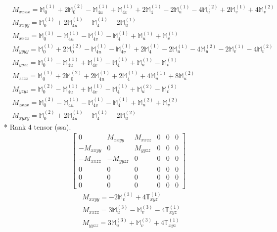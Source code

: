 \documentclass[fleqn,8pt,landscape]{jsarticle}
\begin{document}
\begin{align*}
& M_{xxxx} = \mathbb{M}_{0}^{(1)} + 2 \mathbb{M}_{0}^{(2)} - \mathbb{M}_{4u}^{(1)} + \mathbb{M}_{4v}^{(1)} + 2 \mathbb{M}_{4}^{(1)} - 2 \mathbb{M}_{u}^{(1)} - 4 \mathbb{M}_{u}^{(2)} + 2 \mathbb{M}_{v}^{(1)} + 4 \mathbb{M}_{v}^{(2)} \\
& M_{xxyy} = \mathbb{M}_{0}^{(1)} + 2 \mathbb{M}_{4u}^{(1)} - \mathbb{M}_{4}^{(1)} - 2 \mathbb{M}_{u}^{(1)} \\
& M_{xxzz} = \mathbb{M}_{0}^{(1)} - \mathbb{M}_{4u}^{(1)} - \mathbb{M}_{4v}^{(1)} - \mathbb{M}_{4}^{(1)} + \mathbb{M}_{u}^{(1)} + \mathbb{M}_{v}^{(1)} \\
& M_{yyyy} = \mathbb{M}_{0}^{(1)} + 2 \mathbb{M}_{0}^{(2)} - \mathbb{M}_{4u}^{(1)} - \mathbb{M}_{4v}^{(1)} + 2 \mathbb{M}_{4}^{(1)} - 2 \mathbb{M}_{u}^{(1)} - 4 \mathbb{M}_{u}^{(2)} - 2 \mathbb{M}_{v}^{(1)} - 4 \mathbb{M}_{v}^{(2)} \\
& M_{yyzz} = \mathbb{M}_{0}^{(1)} - \mathbb{M}_{4u}^{(1)} + \mathbb{M}_{4v}^{(1)} - \mathbb{M}_{4}^{(1)} + \mathbb{M}_{u}^{(1)} - \mathbb{M}_{v}^{(1)} \\
& M_{zzzz} = \mathbb{M}_{0}^{(1)} + 2 \mathbb{M}_{0}^{(2)} + 2 \mathbb{M}_{4u}^{(1)} + 2 \mathbb{M}_{4}^{(1)} + 4 \mathbb{M}_{u}^{(1)} + 8 \mathbb{M}_{u}^{(2)} \\
& M_{yzyz} = \mathbb{M}_{0}^{(2)} - \mathbb{M}_{4u}^{(1)} + \mathbb{M}_{4v}^{(1)} - \mathbb{M}_{4}^{(1)} + \mathbb{M}_{u}^{(2)} - \mathbb{M}_{v}^{(2)} \\
& M_{zxzx} = \mathbb{M}_{0}^{(2)} - \mathbb{M}_{4u}^{(1)} - \mathbb{M}_{4v}^{(1)} - \mathbb{M}_{4}^{(1)} + \mathbb{M}_{u}^{(2)} + \mathbb{M}_{v}^{(2)} \\
& M_{xyxy} = \mathbb{M}_{0}^{(2)} + 2 \mathbb{M}_{4u}^{(1)} - \mathbb{M}_{4}^{(1)} - 2 \mathbb{M}_{u}^{(2)}
\end{align*}
* Rank 4 tensor (ssa).
\begin{align*}
\begin{bmatrix} 0 & M_{xxyy} & M_{xxzz} & 0 & 0 & 0 \\ - M_{xxyy} & 0 & M_{yyzz} & 0 & 0 & 0 \\ - M_{xxzz} & - M_{yyzz} & 0 & 0 & 0 & 0 \\ 0 & 0 & 0 & 0 & 0 & 0 \\ 0 & 0 & 0 & 0 & 0 & 0 \\ 0 & 0 & 0 & 0 & 0 & 0 \end{bmatrix}
\end{align*}
\begin{align*}
& M_{xxyy} = - 2 \mathbb{M}_{v}^{(3)} + 4 \mathbb{T}_{xyz}^{(1)} \\
& M_{xxzz} = 3 \mathbb{M}_{u}^{(3)} - \mathbb{M}_{v}^{(3)} - 4 \mathbb{T}_{xyz}^{(1)} \\
& M_{yyzz} = 3 \mathbb{M}_{u}^{(3)} + \mathbb{M}_{v}^{(3)} + 4 \mathbb{T}_{xyz}^{(1)}
\end{align*}
\end{document}
